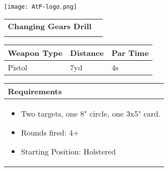 \documentclass[../Cover.tex]{subfiles}
\begin{document}
	\begin{minipage}[t][0.2\textheight][t]{0.1\textwidth} 
		\texttt{[image: AtP-logo.png]}
	\end{minipage}
	\hfill
	\begin{minipage}[t][0.2\textheight][t]{0.8\textwidth}
		\begin{tabular}{ p{} l  }			
			\\
			\small \textbf{Changing Gears Drill} \\
			\\[0.09\textheight]
		\end{tabular}
		\quad
		\begin{tabular}{ | p{} | p{} | p{} |}
			\hline
			\rowcolor[HTML]{C0C0C0}\tiny Weapon Type & \tiny Distance & \tiny Par Time\\ 
			\hline
			\tiny Pistol & \tiny 7yd & \tiny 4s \\ %
			\hline
		\end{tabular}
	\end{minipage}
	\begin{tabular}{p{}}
		\small Requirements \\
		\hline
		\tiny \begin{itemize} %
			\item Two targets, one 8" circle, one 3x5" card.
			\item Rounds fired: 4+
			\item Starting Position: Holstered 
		\end{itemize}		
		\begin{center}
				
		\end{center}
		\\[0.6\textheight]
	\end{tabular}
\end{document}
